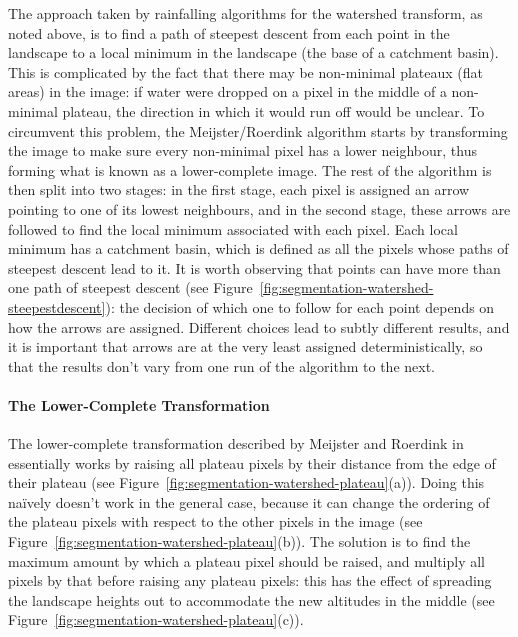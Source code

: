 The approach taken by rainfalling algorithms for the watershed transform, as noted above, is to find a path of steepest descent from each point in the landscape to a local minimum in the landscape (the base of a catchment basin). This is complicated by the fact that there may be non-minimal plateaux (flat areas) in the image: if water were dropped on a pixel in the middle of a non-minimal plateau, the direction in which it would run off would be unclear. To circumvent this problem, the Meijster/Roerdink algorithm starts by transforming the image to make sure every non-minimal pixel has a lower neighbour, thus forming what is known as a lower-complete image. The rest of the algorithm is then split into two stages: in the first stage, each pixel is assigned an arrow pointing to one of its lowest neighbours, and in the second stage, these arrows are followed to find the local minimum associated with each pixel. Each local minimum has a catchment basin, which is defined as all the pixels whose paths of steepest descent lead to it. It is worth observing that points can have more than one path of steepest descent (see Figure~\ref{fig:segmentation-watershed-steepestdescent}): the decision of which one to follow for each point depends on how the arrows are assigned. Different choices lead to subtly different results, and it is important that arrows are at the very least assigned deterministically, so that the results don't vary from one run of the algorithm to the next.

\paragraph{The Lower-Complete Transformation}

The lower-complete transformation described by Meijster and Roerdink in \cite{meijster98} essentially works by raising all plateau pixels by their distance from the edge of their plateau (see Figure~\ref{fig:segmentation-watershed-plateau}(a)). Doing this na\"ively doesn't work in the general case, because it can change the ordering of the plateau pixels with respect to the other pixels in the image (see Figure~\ref{fig:segmentation-watershed-plateau}(b)). The solution is to find the maximum amount by which a plateau pixel should be raised, and multiply all pixels by that before raising any plateau pixels: this has the effect of spreading the landscape heights out to accommodate the new altitudes in the middle (see Figure~\ref{fig:segmentation-watershed-plateau}(c)).

